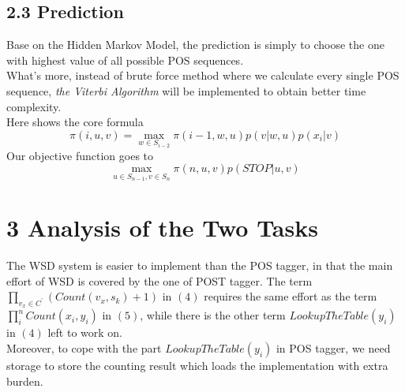 \documentclass{article}
\begin{document}
\subsection*{2.3 Prediction}
Base on the Hidden Markov Model, the prediction is simply to choose the one with highest value of all possible POS sequences.\\[12px]
What's more, instead of brute force method where we calculate every single POS sequence, \textit{the Viterbi Algorithm} will be implemented to obtain better time complexity. \\
Here shows the core formula
\[
\pi(i, u, v) = \max_{w \in S_{i-2}} \pi(i-1, w, u)p(v|w, u)p(x_i | v) \tag{5}
\]
Our objective function goes to
\[
\max_{u\in S_{n-1}, v\in S_n} \pi(n, u, v) p(STOP|u, v)
\]



\section*{3 Analysis of the Two Tasks}
The WSD system is easier to implement than the POS tagger, in that the main effort of WSD is covered by the one of POST tagger. The term $\prod_{v_x \in C^{'}} (Count(v_x, s_k) + 1)$ in $(4)$ requires the same effort as the term $\prod_i^n Count(x_i, y_i)$ in $(5)$, while there is the other term $LookupTheTable(y_i)$ in $(4)$ left to work on. \\[12px]
Moreover, to cope with the part $LookupTheTable(y_i)$ in POS tagger, we need storage to store the counting result which loads the implementation with extra burden.



\nocite{*}
\end{document}
